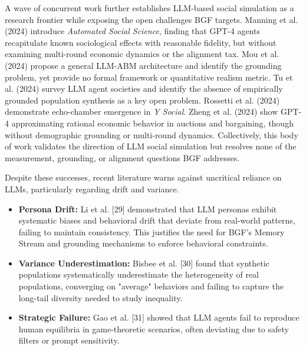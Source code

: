 A wave of concurrent work further establishes LLM-based social simulation as a research frontier while exposing the open challenges BGF targets. Manning et al. (2024) introduce \textit{Automated Social Science}, finding that GPT-4 agents recapitulate known sociological effects with reasonable fidelity, but without examining multi-round economic dynamics or the alignment tax. Mou et al. (2024) propose a general LLM-ABM architecture and identify the grounding problem, yet provide no formal framework or quantitative realism metric. Tu et al. (2024) survey LLM agent societies and identify the absence of empirically grounded population synthesis as a key open problem. Rossetti et al. (2024) demonstrate echo-chamber emergence in \textit{Y Social}. Zheng et al. (2024) show GPT-4 approximating rational economic behavior in auctions and bargaining, though without demographic grounding or multi-round dynamics. Collectively, this body of work validates the direction of LLM social simulation but resolves none of the measurement, grounding, or alignment questions BGF addresses.


Despite these successes, recent literature warns against uncritical reliance on LLMs, particularly regarding drift and variance.

\begin{itemize}
\item \textbf{Persona Drift:} Li et al. [29] demonstrated that LLM personas exhibit systematic biases and behavioral drift that deviate from real-world patterns, failing to maintain consistency. This justifies the need for BGF's Memory Stream and grounding mechanisms to enforce behavioral constraints.
\item \textbf{Variance Underestimation:} Bisbee et al. [30] found that synthetic populations systematically underestimate the heterogeneity of real populations, converging on "average" behaviors and failing to capture the long-tail diversity needed to study inequality.
\item \textbf{Strategic Failure:} Gao et al. [31] showed that LLM agents fail to reproduce human equilibria in game-theoretic scenarios, often deviating due to safety filters or prompt sensitivity.
\end{itemize}

